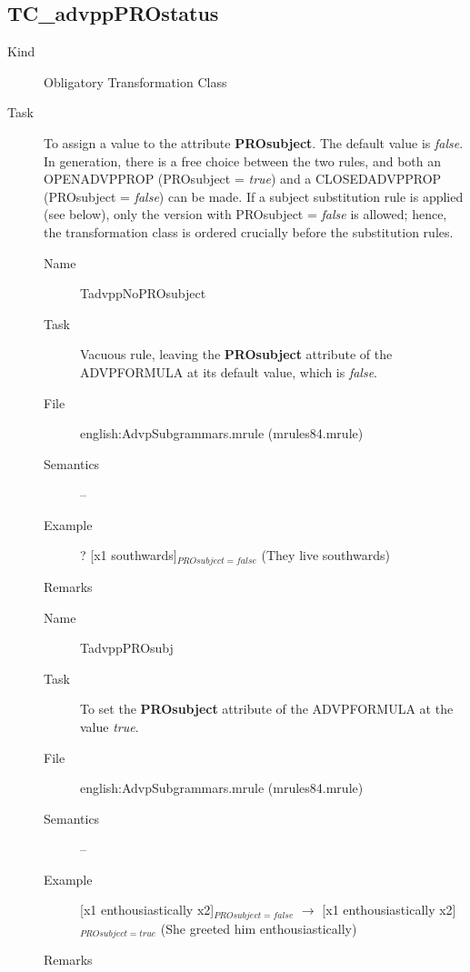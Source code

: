 \subsection{TC\_advppPROstatus}
\begin{description}
\item[Kind] Obligatory Transformation Class
\item[Task] To assign a value to the attribute {\bf PROsubject}. The default 
value is {\em false\/}. In generation, there is a free choice between the two 
rules, and both an OPENADVPPROP (PROsubject = {\em true\/}) and a 
CLOSEDADVPPROP (PROsubject = {\em false\/}) can be made. If a subject 
substitution rule is applied (see below), only the version with PROsubject = {
\em false\/} is allowed; hence, the transformation class is ordered crucially 
before the substitution rules.

\vspace{1 cm}
\begin{description}
\item[Name] TadvppNoPROsubject
\item[Task] Vacuous rule, leaving the {\bf PROsubject} attribute of the 
ADVPFORMULA at its default value, which is {\em false\/}.
\item[File] english:AdvpSubgrammars.mrule (mrules84.mrule)
\item[Semantics] --
\item[Example] ? [x1 southwards]$_{PROsubject=false}$ (They live southwards) 
\item[Remarks] 
\end{description}

\vspace{1 cm}
\begin{description}
\item[Name] TadvppPROsubj
\item[Task] To set the {\bf PROsubject} attribute of the ADVPFORMULA at the 
value {\em true\/}.
\item[File] english:AdvpSubgrammars.mrule (mrules84.mrule)
\item[Semantics] --
\item[Example] [x1 enthousiastically x2]$_{PROsubject=false}$ $\rightarrow$ 
[x1 enthousiastically x2]$_{PROsubject=true}$ (She greeted him 
enthousiastically) 
\item[Remarks] 
\end{description}

\end{description}


